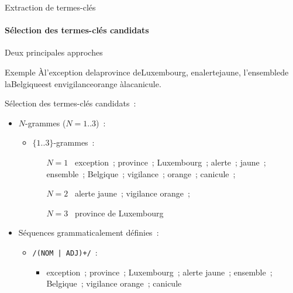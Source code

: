   \begin{frame}{Extraction de termes-clés}\framesubtitle{Sélection des termes-clés candidats}
    Deux principales approches

    \begin{exampleblock}{Exemple}
      \og{}À\textvisiblespace l'\textvisiblespace exception\textvisiblespace
      de\textvisiblespace la\textvisiblespace province\textvisiblespace
      de\textvisiblespace Luxembourg\textvisiblespace ,\textvisiblespace
      en\textvisiblespace alerte\textvisiblespace jaune\textvisiblespace ,
      l'\textvisiblespace ensemble\textvisiblespace de\textvisiblespace
      la\textvisiblespace Belgique\textvisiblespace est\textvisiblespace
      en\textvisiblespace vigilance\textvisiblespace orange\textvisiblespace
      à\textvisiblespace la\textvisiblespace canicule\textvisiblespace .\fg{}

      \vspace{1em}

      Sélection des termes-clés candidats~:
      \begin{itemize}
        \item{$N$-grammes ($N = 1..3$)~:}
          \begin{itemize}
            \item{$\{1..3\}$-grammes~:}
            \begin{itemize}
              \item[$N = 1$~]{
                exception~; province~; Luxembourg~; alerte~; jaune~; ensemble~;
                Belgique~; vigilance~; orange~; canicule~;
              }
              \item[$N = 2$~]{
                alerte jaune~; vigilance orange~;
              }
              \item[$N = 3$~]{
                province de Luxembourg
              }
            \end{itemize}
          \end{itemize}
        \item{Séquences grammaticalement définies~:}
          \begin{itemize}
            \item{\texttt{/(NOM | ADJ)+/}~:}
            \begin{itemize}
              \item{ exception~; province~; Luxembourg~; alerte jaune~;
                  ensemble~;\\Belgique~; vigilance orange~; canicule}
            \end{itemize}
          \end{itemize}
      \end{itemize}
    \end{exampleblock}
  \end{frame}

